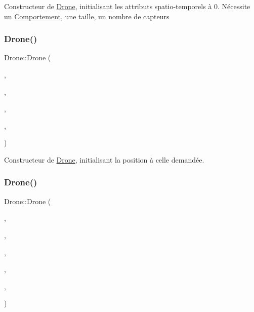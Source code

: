 Constructeur de \mbox{\hyperlink{class_drone}{Drone}}, initialisant les attributs spatio-\/temporels à 0. Nécessite un \mbox{\hyperlink{class_comportement}{Comportement}}, une taille, un nombre de capteurs \mbox{\label{class_drone_a83d355f173a1a04e464a6e1037398376}} 
\subsubsection{\texorpdfstring{Drone()}{Drone()}\hspace{0.1cm}{\footnotesize\ttfamily [5/6]}}
{\footnotesize\ttfamily Drone\+::\+Drone (\begin{DoxyParamCaption}\item[{std\+::vector$<$ \mbox{\hyperlink{class_capteur}{Capteur}} $>$}]{,  }\item[{const float \&}]{,  }\item[{const \mbox{\hyperlink{class_comportement}{Comportement}} \&}]{,  }\item[{const std\+::vector$<$ \mbox{\hyperlink{class_vecteur_r3}{Vecteur\+R3}} $>$}]{,  }\item[{const \mbox{\hyperlink{class_vecteur_r3}{Vecteur\+R3}}}]{ }\end{DoxyParamCaption})}

Constructeur de \mbox{\hyperlink{class_drone}{Drone}}, initialisant la position à celle demandée. \mbox{\label{class_drone_a88bd36472815a6369e33eb206acd1543}} 
\subsubsection{\texorpdfstring{Drone()}{Drone()}\hspace{0.1cm}{\footnotesize\ttfamily [6/6]}}
{\footnotesize\ttfamily Drone\+::\+Drone (\begin{DoxyParamCaption}\item[{std\+::vector$<$ \mbox{\hyperlink{class_capteur}{Capteur}} $>$}]{,  }\item[{const float \&}]{,  }\item[{const \mbox{\hyperlink{class_comportement}{Comportement}} \&}]{,  }\item[{const std\+::vector$<$ \mbox{\hyperlink{class_vecteur_r3}{Vecteur\+R3}} $>$}]{,  }\item[{const \mbox{\hyperlink{class_vecteur_r3}{Vecteur\+R3}}}]{,  }\item[{const \mbox{\hyperlink{class_vecteur_r3}{Vecteur\+R3}}}]{ }\end{DoxyParamCaption})}

